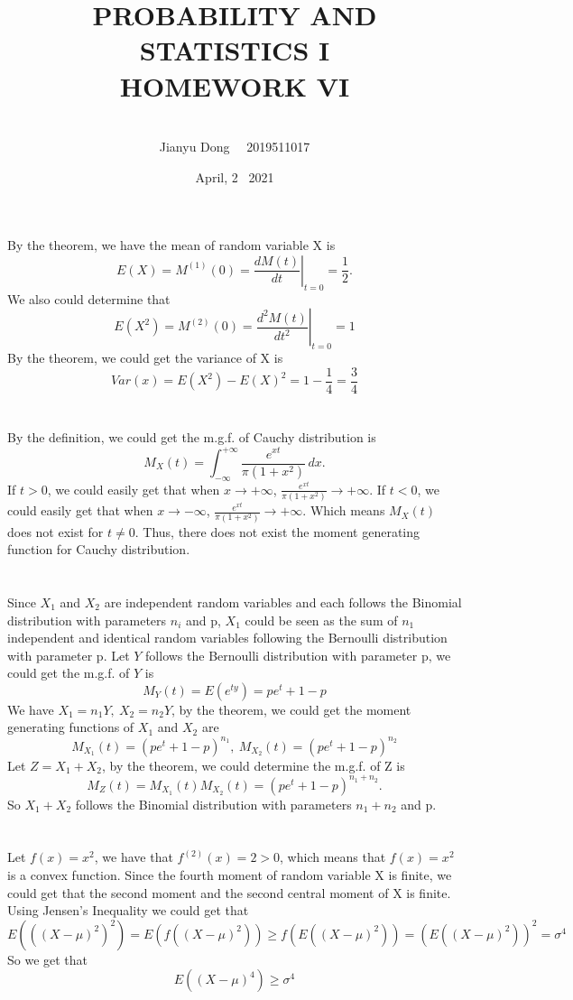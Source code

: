 \documentclass[10.5pt]{article}
\title{PROBABILITY AND STATISTICS I
\\HOMEWORK VI}
\author{\\Jianyu Dong   ~~2019511017}
\date{April, 2~ 2021}
\begin{document}
    
\maketitle
\newpage

\section{}
By the theorem, we have the mean of random variable X is $$E(X) = M^{(1)}(0) = \left.\frac{d M(t)}{dt}\right\rvert_{t=0} = \frac{1}{2}.$$\indent
We also could determine that $$E(X^2) = M^{(2)}(0) = \left.\frac{d^2 M(t)}{dt^2}\right\rvert_{t=0} = 1$$\indent
By the theorem, we could get the variance of X is $$Var(x) = E(X^2)-E(X)^2 = 1-\frac{1}{4} = \frac{3}{4}$$

\section{}
By the definition, we could get the m.g.f. of Cauchy distribution is $$M_X(t) = \int_{-\infty}^{+\infty} \frac{e^{xt}}{\pi(1+x^2)}\,dx.$$\indent
If $t>0$, we could easily get that when $x\to+\infty$, $\frac{e^{xt}}{\pi(1+x^2)}\to+\infty$. If $t<0$, we could easily get that when $x\to-\infty$, $\frac{e^{xt}}{\pi(1+x^2)}\to+\infty$. Which means $M_X(t)$ does not exist for $t\neq 0$. Thus, there does not exist the moment generating function for Cauchy distribution.

\section{}
Since $X_1$ and $X_2$ are independent random variables and each follows the Binomial distribution with parameters $n_i$ and p, $X_1$ could be seen as the sum of $n_1$ independent and identical random variables following the Bernoulli distribution with parameter p. Let $Y$ follows the Bernoulli distribution with parameter p, we could get the m.g.f. of $Y$ is $$M_Y(t) = E(e^{ty}) = pe^{t}+1-p$$\indent
We have $X_1=n_1Y,~X_2=n_2Y$, by the theorem, we could get the moment generating functions of $X_1$ and $X_2$ are $$M_{X_1}(t) = \left(pe^{t}+1-p\right)^{n_1},~M_{X_2}(t) = \left(pe^{t}+1-p\right)^{n_2}$$\indent
Let $Z=X_1+X_2$, by the theorem, we could determine the m.g.f. of Z is $$M_Z(t)=M_{X_1}(t)M_{X_2}(t) = \left(pe^{t}+1-p\right)^{n_1+n_2}.$$\indent
So $X_1+X_2$ follows the Binomial distribution with parameters $n_1+n_2$ and p.

\section{}
Let $f(x)=x^2$, we have that $f^{(2)}(x)=2>0$, which means that $f(x)=x^2$ is a convex function. Since the fourth moment of random variable X is finite, we could get that the second moment and the second central moment of X is finite. Using Jensen's Inequality we could get that $$E\left(\left(\left(X-\mu\right)^2\right)^2\right) = E\left(f\left(\left(X-\mu\right)^2\right)\right) \geqslant f\left(E\left(\left(X-\mu\right)^2\right)\right) = \left(E\left(\left(X-\mu\right)^2\right)\right)^2=\sigma^4$$\indent
So we get that $$E\left(\left(X-\mu\right)^4\right)\geqslant \sigma^4$$
\end{document}
